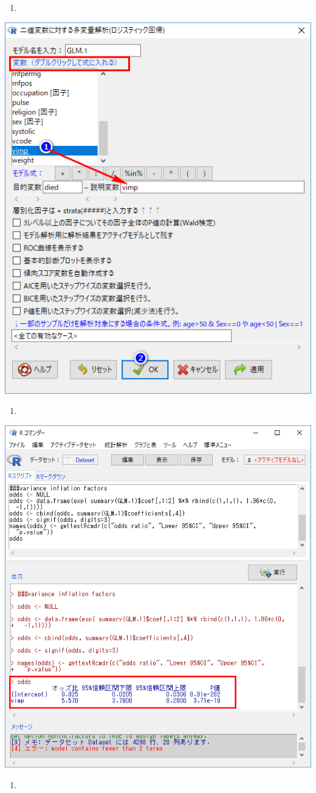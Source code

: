 \documentclass[11pt,]{problemset}
\begin{document}
\begin{enumerate}
\def\labelenumi{\arabic{enumi}.}
\setcounter{enumi}{7}
\item
\end{enumerate}

\begin{center}\includegraphics[width=0.5\linewidth]{pic/logstic07} \end{center}

\newpage
\vfill

\begin{enumerate}
\def\labelenumi{\arabic{enumi}.}
\setcounter{enumi}{8}
\item
\end{enumerate}

\begin{center}\includegraphics[width=0.55\linewidth]{pic/logstic08} \end{center}

\begin{enumerate}
\def\labelenumi{\arabic{enumi}.}
\setcounter{enumi}{9}
\item
\end{enumerate}
\end{document}
